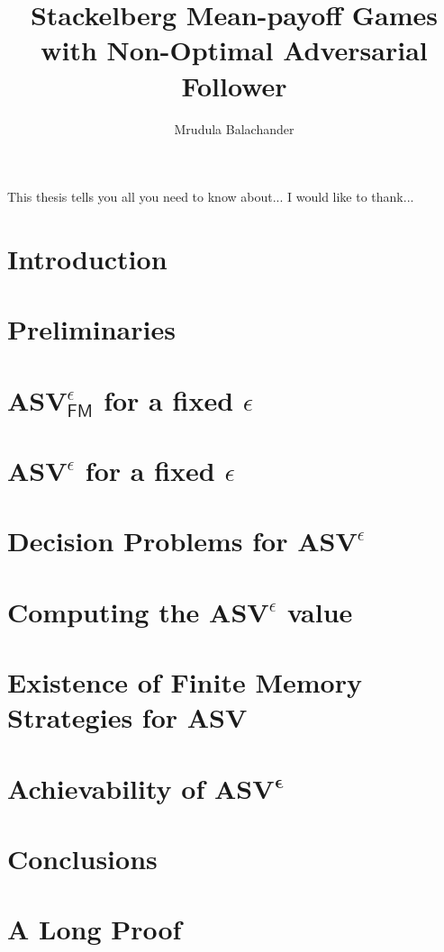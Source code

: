 \documentclass{report}
\begin{document}
\title{Stackelberg Mean-payoff Games with Non-Optimal Adversarial Follower}
\author{Mrudula Balachander}
 
\beforepreface
{}
This thesis tells you all you need to know about...
I would like to thank...
\afterpreface

\chapter{Introduction}
	\label{sec:intro}
	

\chapter{Preliminaries}
  	\label{sec:prelim}
  	

\chapter{$\mathbf{ASV}^{\epsilon}_{\mathsf{FM}}$ for a fixed $\epsilon$}
	\label{sec:FMStrategy}
	

\chapter{$\mathbf{ASV}^{\epsilon}$ for a fixed $\epsilon$}
	

\chapter{Decision Problems for $\mathbf{ASV}^{\epsilon}$}
	

\chapter{Computing the $\mathbf{ASV}^{\epsilon}$ value}
	

\chapter{Existence of Finite Memory Strategies for ASV}
	\label{sec:FMASV}
	
	

\chapter{Achievability of $\mathbf{ASV^{\epsilon}}$}
	

\chapter{Conclusions}

\appendix
	\chapter{A Long Proof}
		


	
\end{document}
